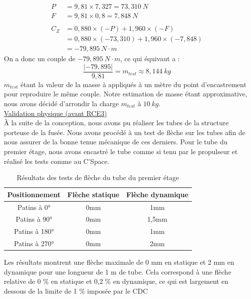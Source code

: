 \begin{align*}
    P &= 9,81 \times 7,327 = 73,310\ N \\
    F &= 9,81 \times 0,8 = 7,848\ N\\
    \\
    C_Z &= 0,880 \times  (- P) + 1,960 \times (- F) \\
    &= 0,880 \times (- 73,310) + 1,960 \times (-7,848) \\
    &= -79,895\ N\cdotp m
\end{align*}
On a donc un couple de $-79,895\ N\cdotp m$, ce qui équivaut a :
$$\frac{|-79,895|}{9,81} = m_{test} \approx 8,144\ kg$$
$m_{test}$ étant la valeur de la masse à appliqués à un mètre du point d'encastrement pour reproduire le même couple.
Notre estimation de masse étant approximative, nous avons décidé d’arrondir la charge $m_{test}$ à $10\ kg$.\\

\underline{Validation physique (avant RCE3)}\\
À la suite de la conception, nous avons pu réaliser les tubes de la structure porteuse de la fusée. Nous avons procédé à un test
de flèche sur les tubes afin de nous assurer de la bonne tenue mécanique de ces derniers. Pour le tube du premier étage, nous
avons encastré le tube comme si tenu par le propulseur et réalisé les tests comme au \gls{C'Space}.\\

\begin{table}[h!]
    \centering
    \begin{tabular}{|c|c|c|}
        \hline
        Positionnement & Flèche statique & Flèche dynamique \\ \hline
        Patins à 0° & 0mm & 1mm \\ \hline
        Patins à 90° & 0mm & 1,5mm \\ \hline
        Patins à 180° & 0mm & 1mm \\ \hline
        Patins à 270° & 0mm & 2mm \\ \hline
        \end{tabular}
    \caption{Résultats des tests de flèche du tube du premier étage}
\end{table}

Les résultats montrent une flèche maximale de 0 mm en statique et 2 mm en dynamique pour une longueur de 1 m de tube. Cela 
correspond à une flèche relative de 0 \% en statique et 0,2 \% en dynamique, ce qui est largement en dessous de la limite de
1 \% imposée par le \gls{CDC} \cite[p.~32]{CDC_BiEtage}

